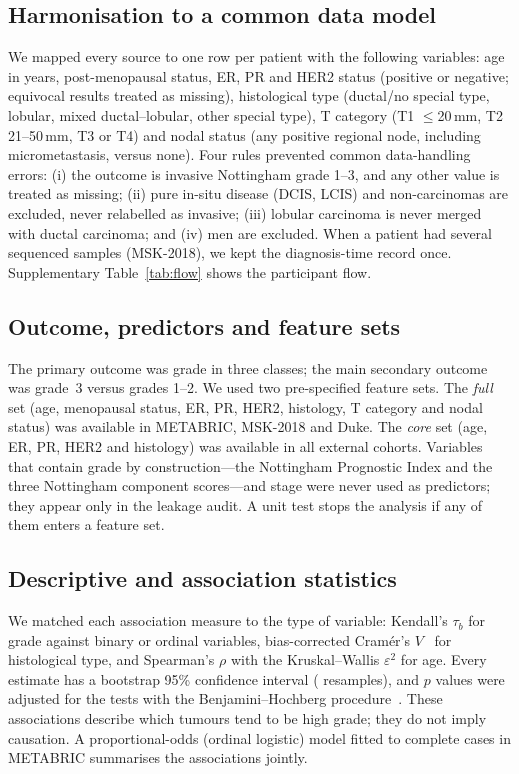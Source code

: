\subsection{Harmonisation to a common data model}
We mapped every source to one row per patient with the following variables: age in years,
post-menopausal status, ER, PR and HER2 status (positive or negative; equivocal results treated as
missing), histological type (ductal/no special type, lobular, mixed ductal--lobular, other special
type), T category (T1 $\le$20\,mm, T2 21--50\,mm, T3 or T4) and nodal status (any positive regional
node, including micrometastasis, versus none). Four rules prevented common data-handling errors:
(i) the outcome is invasive Nottingham grade 1--3, and any other value is treated as missing;
(ii) pure in-situ disease (DCIS, LCIS) and non-carcinomas are excluded, never relabelled as invasive;
(iii) lobular carcinoma is never merged with ductal carcinoma; and (iv) men are excluded. When a
patient had several sequenced samples (MSK-2018), we kept the diagnosis-time record once.
Supplementary Table~\ref{tab:flow} shows the participant flow.

\subsection{Outcome, predictors and feature sets}
The primary outcome was grade in three classes; the main secondary outcome was grade~3 versus
grades 1--2. We used two pre-specified feature sets. The \emph{full} set (age, menopausal status,
ER, PR, HER2, histology, T category and nodal status) was available in METABRIC, MSK-2018 and Duke.
The \emph{core} set (age, ER, PR, HER2 and histology) was available in all external cohorts.
Variables that contain grade by construction---the Nottingham Prognostic Index and the three
Nottingham component scores---and stage were never used as predictors; they appear only in the
leakage audit. A unit test stops the analysis if any of them enters a feature set.

\subsection{Descriptive and association statistics}
We matched each association measure to the type of variable: Kendall's $\tau_b$ for grade against
binary or ordinal variables, bias-corrected Cram\'er's $V$~\citep{bergsma2013cramer} for histological
type, and Spearman's $\rho$ with the Kruskal--Wallis $\varepsilon^2$ for age. Every estimate has a
bootstrap 95\% confidence interval (\Boot{} resamples), and $p$ values were adjusted for the
\NTests{} tests with the Benjamini--Hochberg procedure~\citep{benjamini1995fdr}. These associations
describe which tumours tend to be high grade; they do not imply causation. A proportional-odds
(ordinal logistic) model fitted to complete cases in METABRIC summarises the associations jointly.

